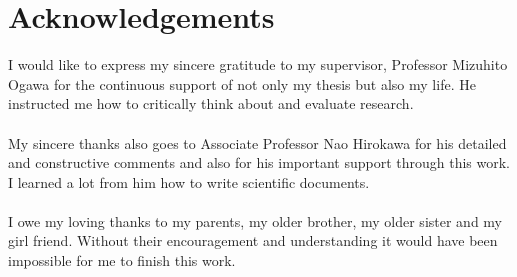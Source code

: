 \chapter*{\centering Acknowledgements}
\noindent I would like to express my sincere gratitude to my supervisor, Professor Mizuhito Ogawa for the continuous support of not only my thesis but also my life. He instructed me how to critically think about and evaluate research.\\\\
My sincere thanks also goes to Associate Professor Nao Hirokawa for his detailed and constructive comments and also for his important support through this work. I learned a lot from him how to write scientific documents. \\\\
I owe my loving thanks to my parents, my older brother, my older sister and my girl friend. Without their encouragement and understanding it would have been impossible for me to finish this work.